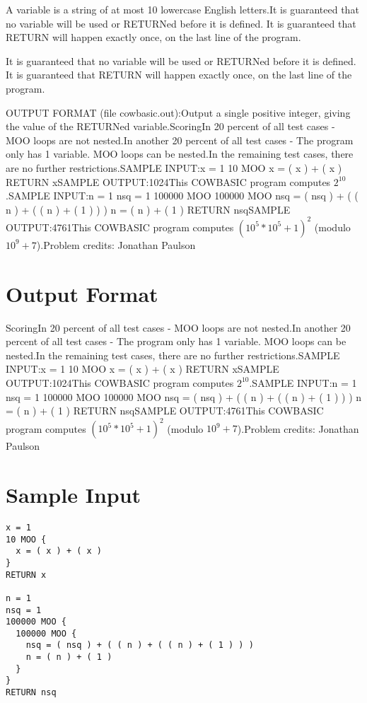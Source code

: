 \documentclass[12pt]{article}
\begin{document}
A variable is a string of at most 10 lowercase English letters.It is guaranteed that no variable will be used or RETURNed before it is defined.
It is guaranteed that RETURN will happen exactly once, on the last line of the
program.

It is guaranteed that no variable will be used or RETURNed before it is defined.
It is guaranteed that RETURN will happen exactly once, on the last line of the
program.

OUTPUT FORMAT (file cowbasic.out):Output a single positive integer, giving the value of the RETURNed variable.ScoringIn 20 percent of all test cases - MOO loops are not nested.In another 20 percent of all test cases - The program only has 1 variable. MOO
loops can be nested.In the remaining test cases, there are no further restrictions.SAMPLE INPUT:x = 1
10 MOO {
  x = ( x ) + ( x )
}
RETURN xSAMPLE OUTPUT:1024This COWBASIC program computes $2^{10}$.SAMPLE INPUT:n = 1
nsq = 1
100000 MOO {
  100000 MOO {
    nsq = ( nsq ) + ( ( n ) + ( ( n ) + ( 1 ) ) )
    n = ( n ) + ( 1 )
  }
}
RETURN nsqSAMPLE OUTPUT:4761This COWBASIC program computes $(10^5*10^5+1)^2$ (modulo $10^9 + 7$).Problem credits: Jonathan Paulson

\section*{Output Format}
ScoringIn 20 percent of all test cases - MOO loops are not nested.In another 20 percent of all test cases - The program only has 1 variable. MOO
loops can be nested.In the remaining test cases, there are no further restrictions.SAMPLE INPUT:x = 1
10 MOO {
  x = ( x ) + ( x )
}
RETURN xSAMPLE OUTPUT:1024This COWBASIC program computes $2^{10}$.SAMPLE INPUT:n = 1
nsq = 1
100000 MOO {
  100000 MOO {
    nsq = ( nsq ) + ( ( n ) + ( ( n ) + ( 1 ) ) )
    n = ( n ) + ( 1 )
  }
}
RETURN nsqSAMPLE OUTPUT:4761This COWBASIC program computes $(10^5*10^5+1)^2$ (modulo $10^9 + 7$).Problem credits: Jonathan Paulson

\section*{Sample Input}
\begin{verbatim}
x = 1
10 MOO {
  x = ( x ) + ( x )
}
RETURN x

n = 1
nsq = 1
100000 MOO {
  100000 MOO {
    nsq = ( nsq ) + ( ( n ) + ( ( n ) + ( 1 ) ) )
    n = ( n ) + ( 1 )
  }
}
RETURN nsq
\end{verbatim}
\end{document}
